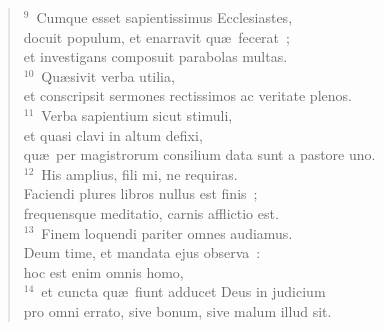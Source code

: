 \begin{flushleft}\begin{verse}${}^{9}$~Cumque esset sapientissimus Ecclesiastes,\\ docuit populum, et enarravit qu\ae\ fecerat~;\\ et investigans composuit parabolas multas.\\
${}^{10}$~Qu\ae sivit verba utilia,\\ et conscripsit sermones rectissimos ac veritate plenos.\\
${}^{11}$~Verba sapientium sicut stimuli,\\ et quasi clavi in altum defixi,\\ qu\ae\ per magistrorum consilium data sunt a pastore uno.\\
${}^{12}$~His amplius, fili mi, ne requiras.\\ Faciendi plures libros nullus est finis~;\\ frequensque meditatio, carnis afflictio est.\\
${}^{13}$~Finem loquendi pariter omnes audiamus.\\ Deum time, et mandata ejus observa~:\\ hoc est enim omnis homo,\\
${}^{14}$~et cuncta qu\ae\ fiunt adducet Deus in judicium\\ pro omni errato, sive bonum, sive malum illud sit.\end{verse}\end{flushleft}


